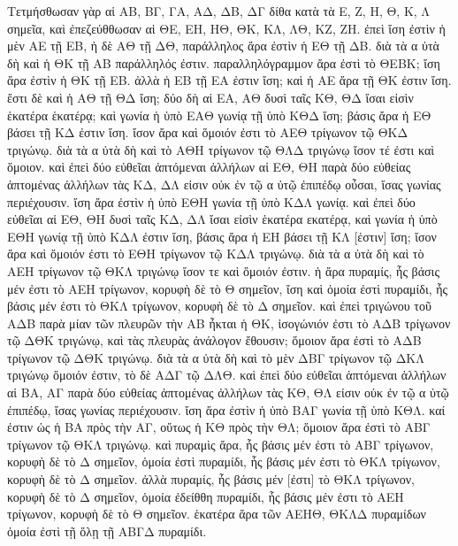 \begin{Parallel}{}{}
{{\greekfont Τετμήσθωσαν γὰρ αἱ ΑΒ, ΒΓ, ΓΑ, ΑΔ, ΔΒ, ΔΓ δίθα κατὰ τὰ Ε, Ζ, Η, Θ, Κ, Λ
σημεῖα, καὶ ἐπεζεύθθωσαν αἱ ΘΕ, ΕΗ, ΗΘ, ΘΚ, ΚΛ, ΛΘ, ΚΖ,
ΖΗ. ἐπεὶ ἴση ἐστὶν ἡ μὲν ΑΕ τῇ ΕΒ, ἡ δὲ ΑΘ τῇ ΔΘ, παράλληλος
ἄρα ἐστὶν ἡ ΕΘ τῇ ΔΒ. διὰ τὰ α ὐτὰ δὴ καὶ ἡ ΘΚ τῇ ΑΒ παράλληλός
ἐστιν. παραλληλόγραμμον ἄρα ἐστὶ τὸ ΘΕΒΚ; ἴση ἄρα ἐστὶν ἡ
ΘΚ τῇ ΕΒ. ἀλλὰ ἡ ΕΒ τῇ ΕΑ ἐστιν ἴση; καὶ ἡ ΑΕ ἄρα τῇ ΘΚ ἐστιν
ἴση. ἔστι δὲ καὶ ἡ ΑΘ τῇ ΘΔ ἴση; δύο δὴ αἱ ΕΑ, ΑΘ δυσὶ ταῖς ΚΘ,
ΘΔ ἴσαι εἰσὶν ἑκατέρα ἑκατέρᾳ; καὶ γωνία ἡ ὑπὸ ΕΑΘ γωνίᾳ
τῇ ὑπὸ ΚΘΔ ἴση; βάσις ἄρα ἡ ΕΘ βάσει τῇ ΚΔ ἐστιν ἴση. ἴσον
ἄρα καὶ ὅμοιόν ἐστι τὸ ΑΕΘ τρίγωνον τῷ ΘΚΔ τριγώνῳ. διὰ τὰ α ὐτὰ
δὴ καὶ τὸ ΑΘΗ τρίγωνον τῷ ΘΛΔ τριγώνῳ ἴσον τέ ἐστι καὶ ὅμοιον.
καὶ ἐπεὶ δύο εὐθεῖαι ἁπτόμεναι ἀλλήλων αἱ ΕΘ, ΘΗ παρὰ δύο εὐθείας
ἁπτομένας ἀλλήλων τὰς ΚΔ, ΔΛ εἰσιν οὐκ ἐν τῷ α ὐτῷ
ἐπιπέδῳ οὖσαι, ἴσας
γωνίας περιέχουσιν. ἴση ἄρα ἐστὶν ἡ ὑπὸ ΕΘΗ γωνία τῇ ὑπὸ
ΚΔΛ γωνίᾳ. καὶ ἐπεὶ δύο εὐθεῖαι αἱ ΕΘ, ΘΗ δυσὶ ταῖς
ΚΔ, ΔΛ ἴσαι εἰσὶν ἑκατέρα εκατέρᾳ,  καὶ γωνία ἡ ὑπὸ ΕΘΗ γωνίᾳ τῇ
ὑπὸ ΚΔΛ ἐστιν ἴση, βάσις ἄρα ἡ ΕΗ βάσει τῇ ΚΛ [ἐστιν] ἴση;
ἴσον ἄρα καὶ ὅμοιόν ἐστι τὸ ΕΘΗ τρίγωνον τῷ ΚΔΛ τριγώνῳ. διὰ τὰ
α ὐτὰ δὴ καὶ τὸ ΑΕΗ τρίγωνον τῷ ΘΚΛ τριγώνῳ ἴσον τε καὶ ὅμοιόν
ἐστιν. ἡ ἄρα πυραμίς, ἧς βάσις μέν ἐστι τὸ ΑΕΗ τρίγωνον, κορυφὴ
δὲ τὸ Θ σημεῖον, ἴση καὶ ὁμοία ἐστὶ πυραμίδι, ἧς
βάσις μέν ἐστι τὸ ΘΚΛ τρίγωνον, κορυφὴ δὲ τὸ Δ σημεῖον. καὶ ἐπεὶ
τριγώνου τοῦ ΑΔΒ παρὰ μίαν τῶν πλευρῶν τὴν ΑΒ ἦκται ἡ ΘΚ, ἰσογώνιόν
ἐστι τὸ ΑΔΒ τρίγωνον τῷ ΔΘΚ τριγώνῳ, καὶ τὰς πλευρὰς ἀνάλογον ἔθουσιν;
ὅμοιον ἄρα ἐστὶ τὸ ΑΔΒ τρίγωνον τῷ ΔΘΚ τριγώνῳ. διὰ τὰ α ὐτὰ δὴ καὶ
τὸ μὲν ΔΒΓ τρίγωνον τῷ ΔΚΛ τριγώνῳ ὅμοιόν ἐστιν, τὸ δὲ ΑΔΓ
τῷ ΔΛΘ. καὶ ἐπεὶ δύο εὐθεῖαι ἁπτόμεναι ἀλλήλων αἱ ΒΑ, ΑΓ παρὰ
δύο εὐθείας ἁπτομένας ἀλλήλων τὰς ΚΘ, ΘΛ εἰσιν οὐκ ἐν τῷ
α ὐτῷ ἐπιπέδῳ, ἴσας γωνίας περιέχουσιν. ἴση ἄρα ἐστὶν ἡ ὑπὸ
ΒΑΓ γωνία τῇ ὑπὸ ΚΘΛ. καί ἐστιν ὡς ἡ ΒΑ πρὸς τὴν ΑΓ, οὕτως
ἡ ΚΘ πρὸς τὴν ΘΛ; ὅμοιον ἄρα ἐστὶ τὸ ΑΒΓ τρίγωνον τῷ ΘΚΛ τριγώνῳ.
καὶ πυραμὶς ἄρα, ἧς βάσις μέν ἐστι τὸ ΑΒΓ τρίγωνον, κορυφὴ
δὲ τὸ Δ σημεῖον, ὁμοία ἐστὶ πυραμίδι, ἧς βάσις μέν ἐστι τὸ ΘΚΛ
τρίγωνον, κορυφὴ δὲ τὸ Δ σημεῖον. ἀλλὰ πυραμίς, ἧς βάσις μέν
[ἐστι] τὸ ΘΚΛ τρίγωνον, κορυφὴ δὲ τὸ Δ σημεῖον, ὁμοία ἐδείθθη
πυραμίδι, ἧς βάσις μέν ἐστι τὸ ΑΕΗ τρίγωνον, κορυφὴ δὲ τὸ Θ σημεῖον.
ἑκατέρα ἄρα τῶν ΑΕΗΘ, ΘΚΛΔ πυραμίδων ὁμοία ἐστὶ τῇ ὅλῃ
τῇ ΑΒΓΔ πυραμίδι.}

}
\end{Parallel}
